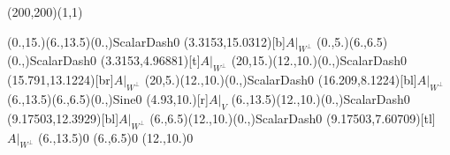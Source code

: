 \unitlength=1bp%

\begin{feynartspicture}(200,200)(1,1)

\FADiagram{}
\FAProp(0.,15.)(6.,13.5)(0.,){ScalarDash}{0}
\FALabel(3.3153,15.0312)[b]{$A|_{W^\perp}$}
\FAProp(0.,5.)(6.,6.5)(0.,){ScalarDash}{0}
\FALabel(3.3153,4.96881)[t]{$A|_{W^\perp}$}
\FAProp(20,15.)(12.,10.)(0.,){ScalarDash}{0}
\FALabel(15.791,13.1224)[br]{$A|_{W^\perp}$}
\FAProp(20,5.)(12.,10.)(0.,){ScalarDash}{0}
\FALabel(16.209,8.1224)[bl]{$A|_{W^\perp}$}
\FAProp(6.,13.5)(6.,6.5)(0.,){Sine}{0}
\FALabel(4.93,10.)[r]{$A|_V$}
\FAProp(6.,13.5)(12.,10.)(0.,){ScalarDash}{0}
\FALabel(9.17503,12.3929)[bl]{$A|_{W^\perp}$}
\FAProp(6.,6.5)(12.,10.)(0.,){ScalarDash}{0}
\FALabel(9.17503,7.60709)[tl]{$A|_{W^\perp}$}
\FAVert(6.,13.5){0}
\FAVert(6.,6.5){0}
\FAVert(12.,10.){0}
\end{feynartspicture}

